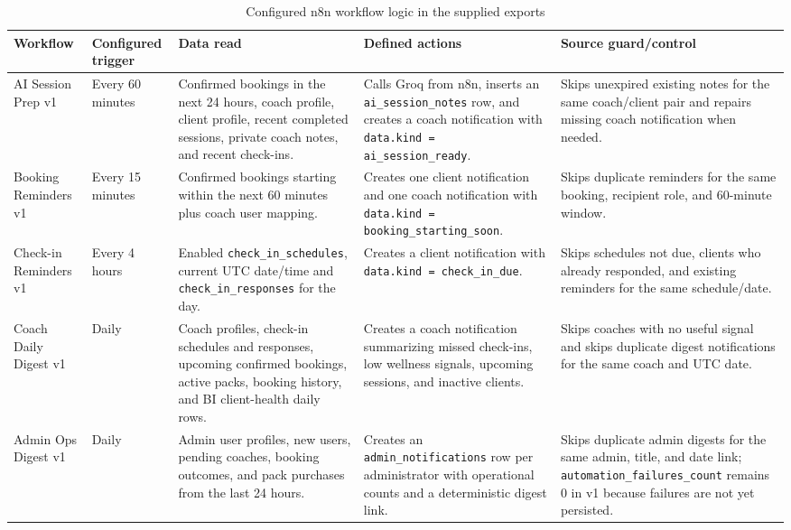 \documentclass[12pt,a4paper,openany]{report}
\begin{document}
\begingroup
\scriptsize
\setlength{\tabcolsep}{3pt}
\renewcommand{\arraystretch}{1.20}
\setlength{\LTpre}{5pt}
\setlength{\LTpost}{10pt}
\begin{longtable}{|L{2.20cm}|L{1.40cm}|L{3.90cm}|L{4.20cm}|L{3.90cm}|}
\caption{Configured n8n workflow logic in the supplied exports}\label{tab:pdf-99-49} \\
\hline
Workflow & Configured trigger & Data read & Defined actions & Source guard/control \\ \hline
AI Session Prep v1 & Every 60 minutes & Confirmed bookings in the next 24 hours, coach profile, client profile, recent completed sessions, private coach notes, and recent check-ins. & Calls Groq from n8n, inserts an \texttt{ai\_session\_notes} row, and creates a coach notification with \texttt{data.kind = ai\_session\_ready}. & Skips unexpired existing notes for the same coach/client pair and repairs missing coach notification when needed. \\ \hline
Booking Reminders v1 & Every 15 minutes & Confirmed bookings starting within the next 60 minutes plus coach user mapping. & Creates one client notification and one coach notification with \texttt{data.kind = booking\_starting\_soon}. & Skips duplicate reminders for the same booking, recipient role, and 60-minute window. \\ \hline
Check-in Reminders v1 & Every 4 hours & Enabled \texttt{check\_in\_schedules}, current UTC date/time and \texttt{check\_in\_responses} for the day. & Creates a client notification with \texttt{data.kind = check\_in\_due}. & Skips schedules not due, clients who already responded, and existing reminders for the same schedule/date. \\ \hline
Coach Daily Digest v1 & Daily & Coach profiles, check-in schedules and responses, upcoming confirmed bookings, active packs, booking history, and BI client-health daily rows. & Creates a coach notification summarizing missed check-ins, low wellness signals, upcoming sessions, and inactive clients. & Skips coaches with no useful signal and skips duplicate digest notifications for the same coach and UTC date. \\ \hline
Admin Ops Digest v1 & Daily & Admin user profiles, new users, pending coaches, booking outcomes, and pack purchases from the last 24 hours. & Creates an \texttt{admin\_notifications} row per administrator with operational counts and a deterministic digest link. & Skips duplicate admin digests for the same admin, title, and date link; \texttt{automation\_failures\_count} remains 0 in v1 because failures are not yet persisted. \\ \hline
\end{longtable}
\endgroup
\end{document}
